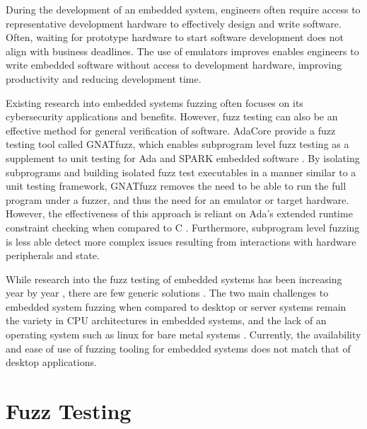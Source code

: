 \documentclass[../report.tex]{subfiles}
\begin{document}
During the development of an embedded system, engineers often require access to
representative development hardware to effectively design and write software.
Often, waiting for prototype hardware to start software development does not
align with business deadlines. The use of emulators improves enables engineers
to write embedded software without access to development hardware, improving
productivity and reducing development time.

Existing research into embedded systems fuzzing often focuses on its
cybersecurity applications and benefits. However, fuzz testing can also be an
effective method for general verification of software. AdaCore provide a fuzz
testing tool called GNATfuzz, which enables subprogram level fuzz testing as a
supplement to unit testing for Ada and SPARK embedded software
\citep{gnatfuzz}. By isolating subprograms and building isolated fuzz test
executables in a manner similar to a unit testing framework, GNATfuzz removes
the need to be able to run the full program under a fuzzer, and thus the need
for an emulator or target hardware. However, the effectiveness of this approach
is reliant on Ada's extended runtime constraint checking when compared to C
\citep{gnatfuzz}. Furthermore, subprogram level fuzzing is less able detect
more complex issues resulting from interactions with hardware peripherals and
state.

While research into the fuzz testing of embedded systems has been increasing
year by year \citep{Yun_2022}, there are few generic solutions
\citep{Eisele_et_al_2022}. The two main challenges to embedded system fuzzing
when compared to desktop or server systems remain the variety in CPU
architectures in embedded systems, and the lack of an operating system such as
linux for bare metal systems \citep{Eisele_et_al_2022}. Currently, the
availability and ease of use of fuzzing tooling for embedded systems does not
match that of desktop applications.

\section{Fuzz Testing}
\end{document}
